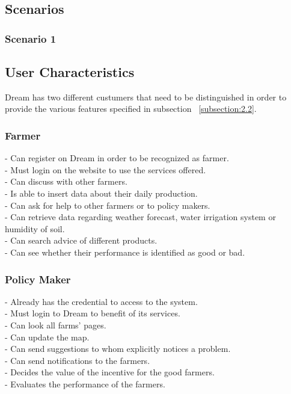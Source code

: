 \documentclass{article}
\begin{document}
\subsection{Scenarios}
\subsubsection{Scenario 1}


\subsection{User Characteristics}
Dream has two different custumers that need to be 
distinguished in order to provide the various 
features specified in subsection ~\ref{subsection:2.2}.
\subsubsection{Farmer}
- Can register on Dream in order to be recognized as farmer.\\
- Must login on the website to use the services offered.\\
- Can discuss with other farmers.\\
- Is able to insert data about their daily production. \\
- Can ask for help to other farmers or to policy makers.\\
- Can retrieve data regarding weather forecast, water irrigation system or humidity of soil.\\
- Can search advice of different products.\\
- Can see whether their performance is identified as good or bad.
\subsubsection{Policy Maker}
- Already has the credential to access to the system.\\
- Must login to Dream to benefit of its services.\\
- Can look all farms' pages.\\
- Can update the map.\\
- Can send suggestions to whom explicitly notices a problem.\\
- Can send notifications to the farmers.\\
- Decides the value of the incentive for the good farmers.\\
- Evaluates the performance of the farmers.\\
\end{document}
